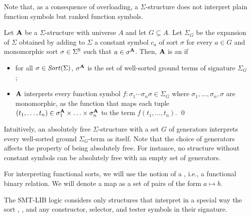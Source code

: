 Note that, as a consequence of overloading,
a $\Sigma$-structure does not interpret plain function symbols
but ranked function symbols.

\begin{definition}
Let $\mathbf{A}$ be a $\Sigma$-structure with universe $A$ and 
let $G \subseteq A$.
Let $\Sigma_G$ be the expansion of $\Sigma$ obtained by adding to $\Sigma$
a constant symbol $c_a$ of sort $\sigma$
for every $a \in G$ and monomorphic sort $\sigma \in \Sigma^\mathrm{S}$ 
such that $a \in \sigma^{\mathbf{A}}$.
Then, $\mathbf{A}$ is an 
if 
\begin{itemize}
\item
for all $\sigma \in \mathit{Sort}(\Sigma)$, $\sigma^{\mathbf{A}}$ is the set 
of well-sorted ground terms of signature $\Sigma_G$;

\item
$\mathbf{A}$ interprets every function symbol 
$f{:}\sigma_1 \cdots \sigma_n \sigma \in \Sigma_G$ 
where $\sigma_1, \ldots, \sigma_n, \sigma$ are monomorphic,
as the function that maps each tuple 
$(t_1,\ldots,t_n) \in \sigma_1^{\mathbf{A}} \times \ldots \times \sigma_n^{\mathbf{A}}$ 
to the term $f(t_1,\ldots,t_n)$.
\qed
\end{itemize}
\end{definition}

Intuitively, an absolutely free $\Sigma$-structure with a set $G$ of generators
interprets every well-sorted ground $\Sigma_G$-term as itself.
Note that the choice of generators affects the property of being absolutely free.
For instance, no structure without constant symbols can be absolutely free 
with an empty set of generators.
\medskip

\begin{newver}
For interpreting functional sorts, we will use the notion of a , i.e., a functional binary relation.
We will denote a map as a set of pairs of the form $a\mapsto b$.
\end{newver}

\medskip
The SMT-LIB logic considers only structures that interpret in a special way 
the sort \bool, , and any constructor, selector, and tester symbols in their signature.

